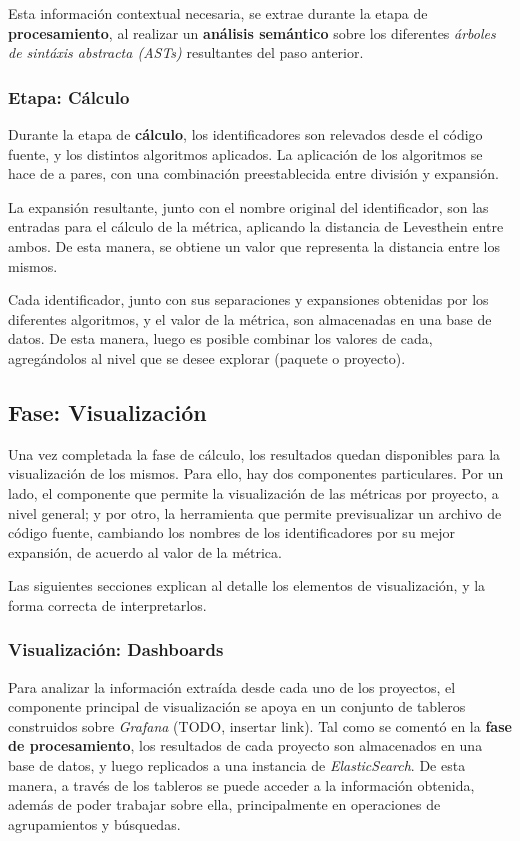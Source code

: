 Esta información contextual necesaria, se extrae durante la etapa de \textbf{procesamiento},
al realizar un \textbf{análisis semántico} sobre los diferentes \textit{árboles de sintáxis abstracta (ASTs)} 
resultantes del paso anterior.

\subsubsection{Etapa: Cálculo}

Durante la etapa de \textbf{cálculo}, los identificadores son relevados desde el código fuente,
y los distintos algoritmos aplicados.
La aplicación de los algoritmos se hace de a pares, con una combinación preestablecida
entre división y expansión.

La expansión resultante, junto con el nombre original del identificador, son las
entradas para el cálculo de la métrica, aplicando la distancia de Levesthein
entre ambos.
De esta manera, se obtiene un valor que representa la distancia entre los mismos.

Cada identificador, junto con sus separaciones y expansiones obtenidas por los diferentes
algoritmos, y el valor de la métrica, son almacenadas en una base de datos.
De esta manera, luego es posible combinar los valores de cada, agregándolos al nivel
que se desee explorar (paquete o proyecto).

\subsection{Fase: Visualización}

Una vez completada la fase de cálculo, los resultados quedan disponibles para la
visualización de los mismos.
Para ello, hay dos componentes particulares.
Por un lado, el componente que permite la visualización de las métricas por proyecto,
a nivel general; y por otro, la herramienta que permite previsualizar un archivo
de código fuente, cambiando los nombres de los identificadores por su mejor expansión,
de acuerdo al valor de la métrica.

Las siguientes secciones explican al detalle los elementos de visualización, y
la forma correcta de interpretarlos.

\subsubsection{Visualización: Dashboards}

Para analizar la información extraída desde cada uno de los proyectos, el componente
principal de visualización se apoya en un conjunto de tableros construidos sobre
\textit{Grafana} (TODO, insertar link).
Tal como se comentó en la \textbf{fase de procesamiento}, los resultados de cada proyecto
son almacenados en una base de datos, y luego replicados a una instancia de \textit{ElasticSearch}.
De esta manera, a través de los tableros se puede acceder a la información obtenida,
además de poder trabajar sobre ella, principalmente en operaciones de agrupamientos
y búsquedas.

